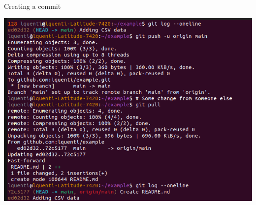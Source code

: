 \documentclass[compress,aspectratio=169]{beamer}
\begin{document}
  \begin{frame}[noframenumbering]{Creating a commit}
    \begin{center}
      \includegraphics[height=0.85\textheight]{./assets/terminal_slideshows/03_Push_Pull_05.png}
    \end{center}
  \end{frame}
\end{document}
